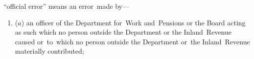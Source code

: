 \documentclass[12pt,a4paper]{article}
\begin{document}
\begin{enumerate}
%


%
%

    “official error” means an error~made by—
\begin{enumerate}\item[]
    ($a$) 
    an officer of the Department for~Work and~Pensions
 or the Board acting as such which no person outside the Department
 or the Inland~Revenue caused or~to~which no person outside the Department
 or~the Inland~Revenue materially contributed;
 

\end{enumerate}
\end{enumerate}
\end{document}
